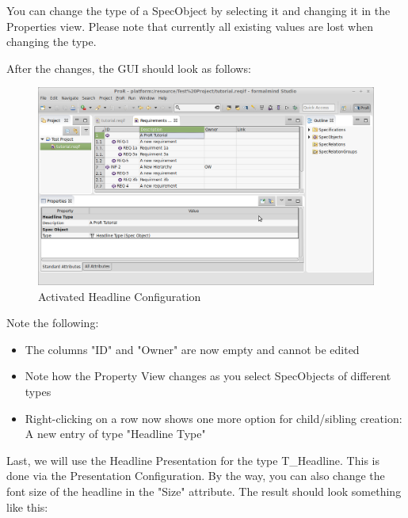 You can change the type of a SpecObject by selecting it and changing it in the Properties view.  Please note that currently all existing values are lost when changing the type.

After the changes, the GUI should look as follows:

\begin{figure}[h!]
\centering      
\includegraphics[width=\linewidth]{../rmf-images/desc_headline.png}      
\caption{Activated Headline Configuration}      
\label{fig:activeHeadlineConfig}
\end{figure}

Note the following:

\begin{itemize}
\item
  The columns "ID" and "Owner" are now empty and cannot be edited
\item
  Note how the Property View changes as you select SpecObjects of different types
\item
  Right-clicking on a row now shows one more option for child/sibling creation: A new entry of type "Headline Type"
\end{itemize}

Last, we will use the Headline Presentation for the type T\_Headline.  This is done via the Presentation Configuration.  By the way, you can also change the font size of the headline in the "Size" attribute.  The result should look something like this:

